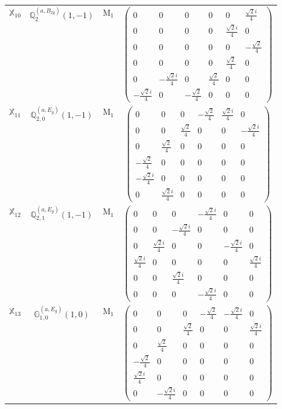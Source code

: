 \documentclass[fleqn,10pt,landscape]{article}
\begin{document}
\begin{itemize}
\begin{center}
\begin{longtable}{c|c|c|c}
$ \mathbb{X}_{10} $ & $\mathbb{Q}_{2}^{(a,B_{2g})}(1,-1)$ & M$_{1}$ & $\begin{pmatrix} 0 & 0 & 0 & 0 & 0 & \frac{\sqrt{2} i}{4} \\ 0 & 0 & 0 & 0 & \frac{\sqrt{2} i}{4} & 0 \\ 0 & 0 & 0 & 0 & 0 & - \frac{\sqrt{2}}{4} \\ 0 & 0 & 0 & 0 & \frac{\sqrt{2}}{4} & 0 \\ 0 & - \frac{\sqrt{2} i}{4} & 0 & \frac{\sqrt{2}}{4} & 0 & 0 \\ - \frac{\sqrt{2} i}{4} & 0 & - \frac{\sqrt{2}}{4} & 0 & 0 & 0 \end{pmatrix}$ \\
$ \mathbb{X}_{11} $ & $\mathbb{Q}_{2,0}^{(a,E_{g})}(1,-1)$ & M$_{1}$ & $\begin{pmatrix} 0 & 0 & 0 & - \frac{\sqrt{2}}{4} & \frac{\sqrt{2} i}{4} & 0 \\ 0 & 0 & \frac{\sqrt{2}}{4} & 0 & 0 & - \frac{\sqrt{2} i}{4} \\ 0 & \frac{\sqrt{2}}{4} & 0 & 0 & 0 & 0 \\ - \frac{\sqrt{2}}{4} & 0 & 0 & 0 & 0 & 0 \\ - \frac{\sqrt{2} i}{4} & 0 & 0 & 0 & 0 & 0 \\ 0 & \frac{\sqrt{2} i}{4} & 0 & 0 & 0 & 0 \end{pmatrix}$ \\
$ \mathbb{X}_{12} $ & $\mathbb{Q}_{2,1}^{(a,E_{g})}(1,-1)$ & M$_{1}$ & $\begin{pmatrix} 0 & 0 & 0 & - \frac{\sqrt{2} i}{4} & 0 & 0 \\ 0 & 0 & - \frac{\sqrt{2} i}{4} & 0 & 0 & 0 \\ 0 & \frac{\sqrt{2} i}{4} & 0 & 0 & - \frac{\sqrt{2} i}{4} & 0 \\ \frac{\sqrt{2} i}{4} & 0 & 0 & 0 & 0 & \frac{\sqrt{2} i}{4} \\ 0 & 0 & \frac{\sqrt{2} i}{4} & 0 & 0 & 0 \\ 0 & 0 & 0 & - \frac{\sqrt{2} i}{4} & 0 & 0 \end{pmatrix}$ \\
$ \mathbb{X}_{13} $ & $\mathbb{G}_{1,0}^{(a,E_{g})}(1,0)$ & M$_{1}$ & $\begin{pmatrix} 0 & 0 & 0 & - \frac{\sqrt{2}}{4} & - \frac{\sqrt{2} i}{4} & 0 \\ 0 & 0 & \frac{\sqrt{2}}{4} & 0 & 0 & \frac{\sqrt{2} i}{4} \\ 0 & \frac{\sqrt{2}}{4} & 0 & 0 & 0 & 0 \\ - \frac{\sqrt{2}}{4} & 0 & 0 & 0 & 0 & 0 \\ \frac{\sqrt{2} i}{4} & 0 & 0 & 0 & 0 & 0 \\ 0 & - \frac{\sqrt{2} i}{4} & 0 & 0 & 0 & 0 \end{pmatrix}$ \\

\end{longtable}
\end{center}
\end{itemize}
\end{document}
